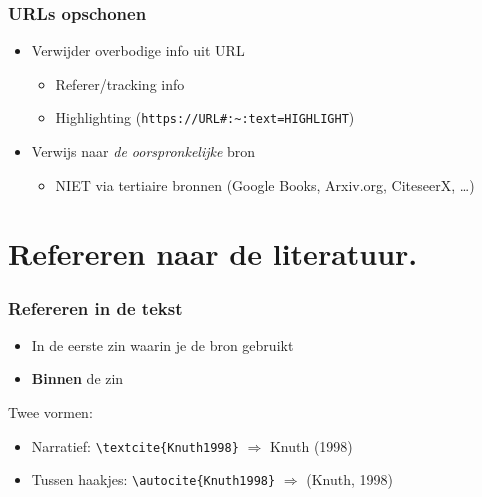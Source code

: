 \documentclass[aspectratio=169]{beamer}
\begin{document}
\begin{frame}[fragile]
  \frametitle{URLs opschonen}

  \begin{itemize}
    \item Verwijder overbodige info uit URL
      \begin{itemize}
        \item Referer/tracking info
        \item Highlighting (\verb+https://URL#:~:text=HIGHLIGHT+)
      \end{itemize}
    \item Verwijs naar \textit{de oorspronkelijke} bron
      \begin{itemize}
        \item NIET via tertiaire bronnen (Google Books, Arxiv.org, CiteseerX, \ldots)
      \end{itemize}
  \end{itemize}

\end{frame}

\section{Refereren naar de literatuur.}

\begin{frame}[fragile]
  \frametitle{Refereren in de tekst}

  \begin{itemize}
    \item In de eerste zin waarin je de bron gebruikt
    \item \textbf{Binnen} de zin
  \end{itemize}

  \bigskip
  Twee vormen:

  \begin{itemize}
    \item Narratief: \verb|\textcite{Knuth1998}| \(\Rightarrow{}\) Knuth (1998)
    \item Tussen haakjes: \verb|\autocite{Knuth1998}| \(\Rightarrow{}\) (Knuth, 1998)
  \end{itemize}

\end{frame}
\end{document}
